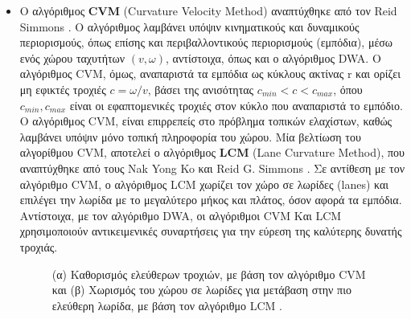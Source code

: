 \begin{itemize}
\item Ο αλγόριθμος \textbf{CVM} (Curvature Velocity Method) αναπτύχθηκε από τον Reid Simmons \cite{cvm}. Ο αλγόριθμος λαμβάνει υπόψιν κινηματικούς και δυναμικούς περιορισμούς, όπως επίσης και περιβαλλοντικούς περιορισμούς (εμπόδια), μέσω ενός χώρου ταχυτήτων $(v,\omega)$, αντίστοιχα, όπως και ο αλγόριθμος DWA. Ο αλγόριθμος CVM, όμως, αναπαριστά τα εμπόδια ως κύκλους ακτίνας r και ορίζει μη εφικτές τροχιές $c=\omega/v$, βάσει της ανισότητας $c_{min}<c<c_{max}$, όπου $c_{min}, c_{max}$ είναι οι εφαπτομενικές τροχιές στον κύκλο που αναπαριστά το εμπόδιο. Ο αλγόριθμος CVM, είναι επιρρεπείς στο πρόβλημα τοπικών ελαχίστων, καθώς λαμβάνει υπόψιν μόνο τοπική πληροφορία του χώρου. Μία βελτίωση του αλγορίθμου CVM, αποτελεί ο αλγόριθμος \textbf{LCM} (Lane Curvature Method), που αναπτύχθηκε από τους Nak Yong Ko και Reid G. Simmons \cite{lcm}. Σε αντίθεση με τον αλγόριθμο CVM, ο αλγόριθμος LCM χωρίζει τον χώρο σε λωρίδες (lanes) και επιλέγει την λωρίδα με το μεγαλύτερο μήκος και πλάτος, όσον αφορά τα εμπόδια. Αντίστοιχα, με τον αλγόριθμο DWA, οι αλγόριθμοι CVM Και LCM χρησιμοποιούν αντικειμενικές συναρτήσεις για την εύρεση της καλύτερης δυνατής τροχιάς.

\begin{figure}[!ht]
	\centering
	\caption[(α) Καθορισμός ελεύθερων τροχιών, με βάση τον αλγόριθμο CVM και (β) Χωρισμός του χώρου σε λωρίδες για μετάβαση στην πιο ελεύθερη λωρίδα, με βάση τον αλγόριθμο LCM.]{(α) Καθορισμός ελεύθερων τροχιών, με βάση τον αλγόριθμο CVM \cite{cvm} και (β) Χωρισμός του χώρου σε λωρίδες για μετάβαση στην πιο ελεύθερη λωρίδα, με βάση τον αλγόριθμο LCM \cite{lcm}.}
	\label{fig:cvm_and_lcm}
\end{figure}

\end{itemize}

